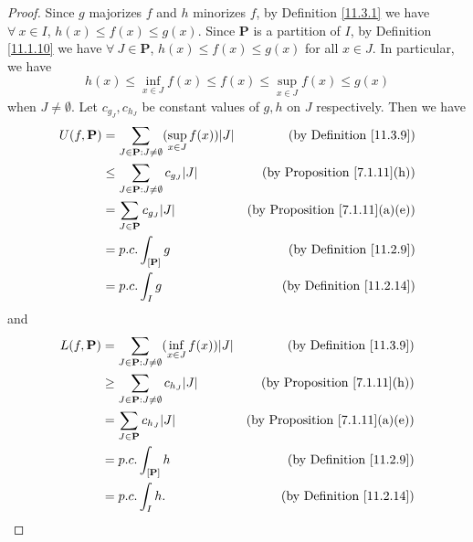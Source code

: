 \begin{proof}
    Since \(g\) majorizes \(f\) and \(h\) minorizes \(f\), by Definition \ref{11.3.1} we have \(\forall\ x \in I\), \(h(x) \leq f(x) \leq g(x)\).
    Since \(\mathbf{P}\) is a partition of \(I\), by Definition \ref{11.1.10} we have \(\forall\ J \in \mathbf{P}\), \(h(x) \leq f(x) \leq g(x)\) for all \(x \in J\).
    In particular, we have
    \[
        h(x) \leq \inf_{x \in J} f(x) \leq f(x) \leq \sup_{x \in J} f(x) \leq g(x)
    \]
    when \(J \neq \emptyset\).
    Let \(c_{g_J}, c_{h_J}\) be constant values of \(g, h\) on \(J\) respectively.
    Then we have
    \begin{align*}
        U(f, \mathbf{P}) & = \sum_{J \in \mathbf{P} : J \neq \emptyset} (\sup_{x \in J} f(x)) \abs*{J} & \text{(by Definition \ref{11.3.9})}        \\
                         & \leq \sum_{J \in \mathbf{P} : J \neq \emptyset} c_{g_J} \abs*{J}            & \text{(by Proposition \ref{7.1.11}(h))}    \\
                         & = \sum_{J \in \mathbf{P}} c_{g_J} \abs*{J}                                  & \text{(by Proposition \ref{7.1.11}(a)(e))} \\
                         & = p.c. \int_{[\mathbf{P}]} g                                                & \text{(by Definition \ref{11.2.9})}        \\
                         & = p.c. \int_I g                                                             & \text{(by Definition \ref{11.2.14})}
    \end{align*}
    and
    \begin{align*}
        L(f, \mathbf{P}) & = \sum_{J \in \mathbf{P} : J \neq \emptyset} (\inf_{x \in J} f(x)) \abs*{J} & \text{(by Definition \ref{11.3.9})}        \\
                         & \geq \sum_{J \in \mathbf{P} : J \neq \emptyset} c_{h_J} \abs*{J}            & \text{(by Proposition \ref{7.1.11}(h))}    \\
                         & = \sum_{J \in \mathbf{P}} c_{h_J} \abs*{J}                                  & \text{(by Proposition \ref{7.1.11}(a)(e))} \\
                         & = p.c. \int_{[\mathbf{P}]} h                                                & \text{(by Definition \ref{11.2.9})}        \\
                         & = p.c. \int_I h.                                                            & \text{(by Definition \ref{11.2.14})}
    \end{align*}
\end{proof}

